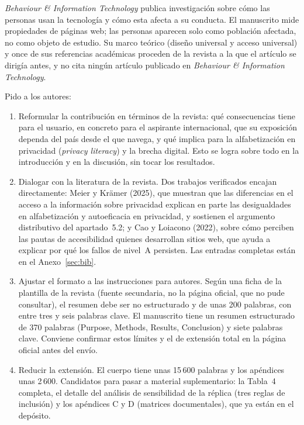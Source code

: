 \documentclass[11pt,a4paper]{article}
\begin{document}
\emph{Behaviour \& Information Technology} publica investigaci\'on sobre c\'omo las personas usan la tecnolog\'ia y c\'omo esta afecta a su conducta. El manuscrito mide propiedades de p\'aginas web; las personas aparecen solo como poblaci\'on afectada, no como objeto de estudio. Su marco te\'orico (dise\~no universal y acceso universal) y once de sus referencias acad\'emicas proceden de la revista a la que el art\'iculo se dirig\'ia antes, y no cita ning\'un art\'iculo publicado en \emph{Behaviour \& Information Technology}.

Pido a los autores:
\begin{enumerate}
	\item Reformular la contribuci\'on en t\'erminos de la revista: qu\'e consecuencias tiene para el usuario, en concreto para el aspirante internacional, que su exposici\'on dependa del pa\'is desde el que navega, y qu\'e implica para la alfabetizaci\'on en privacidad (\emph{privacy literacy}) y la brecha digital. Esto se logra sobre todo en la introducci\'on y en la discusi\'on, sin tocar los resultados.
	\item Dialogar con la literatura de la revista. Dos trabajos verificados encajan directamente: Meier y Kr\"amer (2025), que muestran que las diferencias en el acceso a la informaci\'on sobre privacidad explican en parte las desigualdades en alfabetizaci\'on y autoeficacia en privacidad, y sostienen el argumento distributivo del apartado~5.2; y Cao y Loiacono (2022), sobre c\'omo perciben las pautas de accesibilidad quienes desarrollan sitios web, que ayuda a explicar por qu\'e los fallos de nivel~A persisten. Las entradas completas est\'an en el Anexo~\ref{sec:bib}.
	\item Ajustar el formato a las instrucciones para autores. Seg\'un una ficha de la plantilla de la revista (fuente secundaria, no la p\'agina oficial, que no pude consultar), el resumen debe ser no estructurado y de unas 200 palabras, con entre tres y seis palabras clave. El manuscrito tiene un resumen estructurado de 370 palabras (Purpose, Methods, Results, Conclusion) y siete palabras clave. Conviene confirmar estos l\'imites y el de extensi\'on total en la p\'agina oficial antes del env\'io.
	\item Reducir la extensi\'on. El cuerpo tiene unas 15\,600 palabras y los ap\'endices unas 2\,600. Candidatos para pasar a material suplementario: la Tabla~4 completa, el detalle del an\'alisis de sensibilidad de la r\'eplica (tres reglas de inclusi\'on) y los ap\'endices C y D (matrices documentales), que ya est\'an en el dep\'osito.
\end{enumerate}
\end{document}
